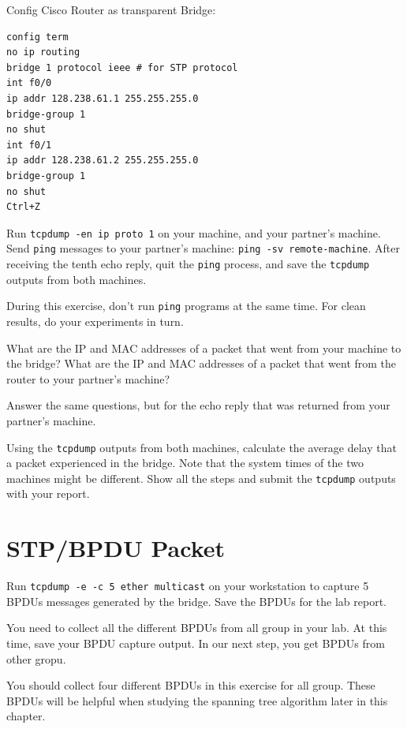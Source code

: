 \documentclass{../UTNetLab}
\begin{document}
    Config Cisco Router as transparent Bridge:
    \begin{lstlisting}[language={cisco}]
config term
no ip routing
bridge 1 protocol ieee # for STP protocol
int f0/0
ip addr 128.238.61.1 255.255.255.0
bridge-group 1
no shut
int f0/1
ip addr 128.238.61.2 255.255.255.0
bridge-group 1
no shut
Ctrl+Z
    \end{lstlisting}
    
    Run \lstinline{tcpdump -en ip proto 1} on your machine, and your partner’s machine. Send \lstinline{ping} messages to your partner’s machine: \lstinline[emph={your-host, remote-host}]{ping -sv remote-machine}.
    After receiving the tenth echo reply, quit the \lstinline{ping} process, and save the \lstinline{tcpdump} outputs from both machines.

    During this exercise, don’t run \lstinline{ping} programs at the same time. For clean results, do your experiments in turn.
    
    \begin{report}
    \item What are the IP and MAC addresses of a packet that went from your machine to the bridge?
    What are the IP and MAC addresses of a packet that went from the router to your partner’s machine?

    \item Answer the same questions, but for the echo reply that was returned from your partner’s machine.
    \end{report}

    Using the \lstinline{tcpdump} outputs from both machines, calculate the average delay that a packet experienced in the bridge.
    Note that the system times of the two machines might be different.
    Show all the steps and submit the \lstinline{tcpdump} outputs with your report.


\section{STP/BPDU Packet}
    Run \lstinline{tcpdump -e -c 5 ether multicast} on your workstation to capture 5 BPDUs messages generated by the bridge.
    Save the BPDUs for the lab report.

    You need to collect all the different BPDUs from all group in your lab.
    At this time, save your BPDU capture output. 
    In our next step,  you get BPDUs from other gropu.

    You should collect four different BPDUs in this exercise for all group.
    These BPDUs will be helpful when studying the spanning tree algorithm later in this chapter.
\end{document}
